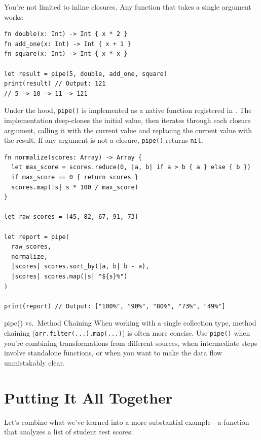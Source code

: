 You're not limited to inline closures. Any function that takes a single argument works:

\begin{lstlisting}[language=Lattice, caption={Using named functions with pipe}]
fn double(x: Int) -> Int { x * 2 }
fn add_one(x: Int) -> Int { x + 1 }
fn square(x: Int) -> Int { x * x }

let result = pipe(5, double, add_one, square)
print(result) // Output: 121
// 5 -> 10 -> 11 -> 121
\end{lstlisting}

Under the hood, \lstinline|pipe()| is implemented as a native function registered in . The implementation deep-clones the initial value, then iterates through each closure argument, calling it with the current value and replacing the current value with the result. If any argument is not a closure, \lstinline|pipe()| returns \lstinline|nil|.

\begin{lstlisting}[language=Lattice, caption={Combining named functions and closures in pipe}]
fn normalize(scores: Array) -> Array {
  let max_score = scores.reduce(0, |a, b| if a > b { a } else { b })
  if max_score == 0 { return scores }
  scores.map(|s| s * 100 / max_score)
}

let raw_scores = [45, 82, 67, 91, 73]

let report = pipe(
  raw_scores,
  normalize,
  |scores| scores.sort_by(|a, b| b - a),
  |scores| scores.map(|s| "${s}%")
)

print(report) // Output: ["100%", "90%", "80%", "73%", "49%"]
\end{lstlisting}

\begin{tipbox}{pipe() vs.\ Method Chaining}
When working with a single collection type, method chaining (\lstinline|arr.filter(...).map(...)|) is often more concise. Use \lstinline|pipe()| when you're combining transformations from different sources, when intermediate steps involve standalone functions, or when you want to make the data flow unmistakably clear.
\end{tipbox}

\section{Putting It All Together}\label{sec:control-flow-together}

Let's combine what we've learned into a more substantial example---a function that analyzes a list of student test scores:

